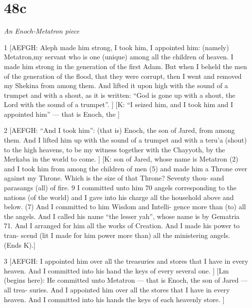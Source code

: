 \chapter{48c}

\par \textit{An Enoch-Metatron piece}

\par 1 [AEFGH: Aleph made him strong, I took him, I appointed him: (namely) Metatron,my servant who is one (unique) among all the children of heaven. I made him strong in the generation of the first Adam. But when I beheld the men of the generation of the flood, that they were corrupt, then I went and removed my Shekina from among them. And lifted it upon high with the sound of a trumpet and with a shout, as it is written: “God is gone up with a shout, the Lord with the sound of a trumpet”. ] [K: “I seized him, and I took him and I appointed him” — that is Enoch, the ]


\par 2 [AEFGH: “And I took him”: (that is) Enoch, the son of Jared, from among them. And I lifted him up with the sound of a trumpet and with a teru'a (shout) to the high heavens, to be my witness together with the Chayyoth, by the Merkaba in the world to come. ] [K: son of Jared, whose name is Metatron (2) and I took him from among the children of men (5) and made him a Throne over against my Throne. Which is the size of that Throne? Seventy thou- sand parasangs (all) of fire. 9 I committed unto him 70 angels corresponding to the nations (of the world) and I gave into his charge all the household above and below. (7) And I committed to him Wisdom and Intelli- gence more than (to) all the angels. And I called his name “the lesser yah”, whose name is by Gematria 71. And I arranged for him all the works of Creation. And I made his power to tran- scend (lit I made for him power more than) all the ministering angels. (Ends K).]

\par 3 [AEFGH: I appointed him over all the treasuries and stores that I have in every heaven. And I committed into his hand the keys of every several one. ] [Lm (begins here): He committed unto Metatron — that is Enoch, the son of Jared — all trea- suries. And I appointed him over all the stores that I have in every heaven. And I committed into his hands the keys of each heavenly store. ]

